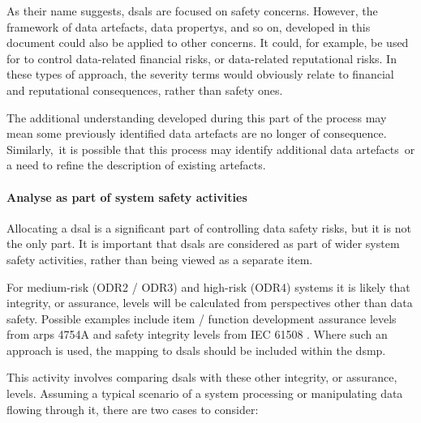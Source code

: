 As their name suggests, \glspl{dsal} are focused on safety concerns. However, the framework of \glspl{data artefact}, \glspl{data property}, and so on, developed in this document could also be applied to other concerns. It could, for example, be used for to control data-related financial risks, or data-related reputational risks. In these types of approach, the severity terms would obviously relate to financial and reputational consequences, rather than safety ones.

\cbstart The additional understanding developed during this part of the process may mean some previously identified \glspl{data artefact} are no longer of consequence. Similarly,\cbend\ it is possible that this process may identify additional \cbstart\glspl{data artefact}\cbend\ or a need to refine the description of existing artefacts.

\paragraph{Analyse  as part of system safety activities}
\label{bkm:activities:analyse:partofsystemsafetyactivities}
Allocating a \gls{dsal} is a significant part of controlling data safety risks, but it is not the only part. It is important that \glspl{dsal} are considered as part of wider system safety activities, rather than being viewed as a separate item.

For medium-risk (ODR2 / ODR3) and high-risk (ODR4) systems it is likely that \gls{integrity}, or assurance, levels will be calculated from perspectives other than data safety. Possible examples include item / function development assurance levels from \glspl{arp} 4754A \cite{citation:arp4754a2010guidelines} and safety \gls{integrity} levels from IEC 61508 \cite{citation:iec615083}.
Where such an approach is used, the mapping to \glspl{dsal} should be included within the \gls{dsmp}.

This activity involves comparing \glspl{dsal} with these other \gls{integrity}, or assurance, levels. Assuming a typical scenario of a system processing or manipulating data flowing through it, there are two cases to consider:

